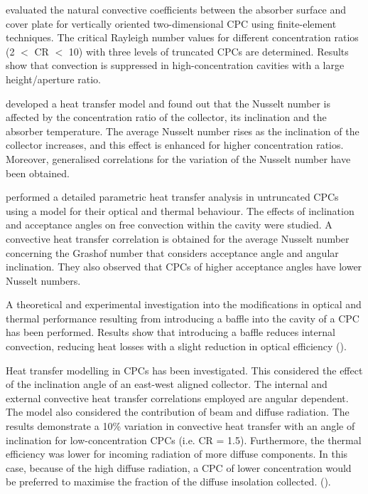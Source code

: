 \citet{AbdelKhalik1978} evaluated the natural convective coefficients between the absorber surface and cover plate for vertically oriented two-dimensional CPC using finite-element techniques. The critical Rayleigh number values for different concentration ratios (2 $<$ CR $<$ 10) with three levels of truncated CPCs are determined. Results show that convection is suppressed in high-concentration cavities with a large height/aperture ratio.


\citet{Prapas1987} developed a heat transfer model and found out that the Nusselt number is affected by the concentration ratio of the collector, its inclination and the absorber temperature. The average Nusselt number rises as the inclination of the collector increases, and this effect is enhanced for higher concentration ratios. Moreover, generalised correlations for the variation of the Nusselt number have been obtained.

\citet{Eames1993} performed a detailed parametric heat transfer analysis in untruncated CPCs using a model for their optical and thermal behaviour. The effects of inclination and acceptance angles on free convection within the cavity were studied. A convective heat transfer correlation is obtained for the average Nusselt number concerning the Grashof number that considers acceptance angle and angular inclination. They also observed that CPCs of higher acceptance angles have lower Nusselt numbers.

A theoretical and experimental investigation into the modifications in optical and thermal performance resulting from introducing a baffle into the cavity of a CPC has been performed. Results show that introducing a baffle reduces internal convection, reducing heat losses with a slight reduction in optical efficiency (\cite{Eames1995}).

Heat transfer modelling in CPCs has been investigated. This considered the effect of the inclination angle of an east-west aligned collector. The internal and external convective heat transfer correlations employed are angular dependent. The model also considered the contribution of beam and diffuse radiation. The results demonstrate a 10\% variation in convective heat transfer with an angle of inclination for low-concentration CPCs (i.e. CR = 1.5). Furthermore, the thermal efficiency was lower for incoming radiation of more diffuse components. In this case, because of the high diffuse radiation, a CPC of lower concentration would be preferred to maximise the fraction of the diffuse insolation collected. (\cite{Kothdiwala1995}).

